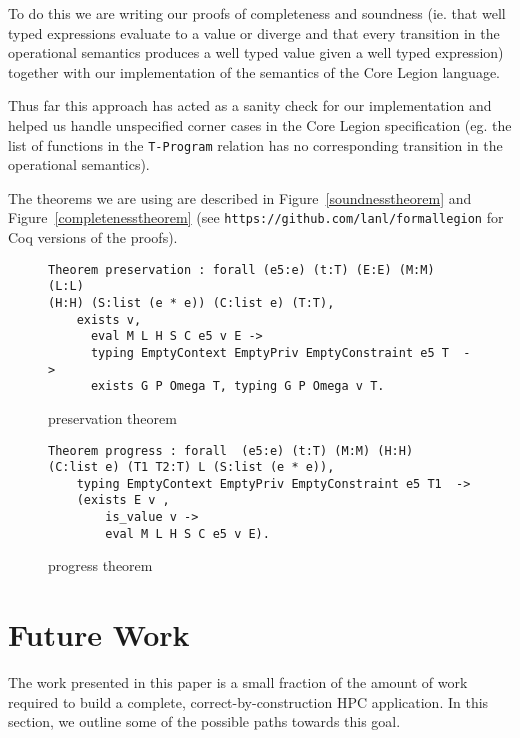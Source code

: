\documentclass[sigconf]{acmart}
\begin{document}
To do this we are writing our proofs of completeness and soundness (ie. that well
typed expressions evaluate to a value or diverge and that every transition in
the operational semantics produces a well typed value given a well typed
expression) together with our implementation of the semantics of the Core
Legion language.

Thus far this approach has acted as a sanity check for our implementation and
helped us handle unspecified corner cases in the Core Legion specification (eg.
the list of functions in the \texttt{T-Program} relation has no corresponding
transition in the operational semantics). 

The theorems we are using are described in Figure~\ref{soundnesstheorem} and
Figure~\ref{completenesstheorem} (see \texttt{https://github.com/lanl/formallegion}
for Coq versions of the proofs). 

\begin{figure}
\begin{BVerbatim}
Theorem preservation : forall (e5:e) (t:T) (E:E) (M:M) (L:L) 
(H:H) (S:list (e * e)) (C:list e) (T:T),
    exists v,
      eval M L H S C e5 v E ->
      typing EmptyContext EmptyPriv EmptyConstraint e5 T  ->
      exists G P Omega T, typing G P Omega v T.
\end{BVerbatim}
\caption{preservation theorem}
\label{preservationtheorem}
\end{figure}

\begin{figure}
\begin{BVerbatim}
Theorem progress : forall  (e5:e) (t:T) (M:M) (H:H)  
(C:list e) (T1 T2:T) L (S:list (e * e)),
    typing EmptyContext EmptyPriv EmptyConstraint e5 T1  ->
    (exists E v ,
        is_value v ->
        eval M L H S C e5 v E).
\end{BVerbatim}
\caption{progress theorem}
\label{progresstheorem}
\end{figure}


\section{Future Work}

The work presented in this paper is a small fraction of the
amount of work required to build a complete, correct-by-construction HPC
application. In this section, we outline some of the possible paths towards
this goal. 
\end{document}
